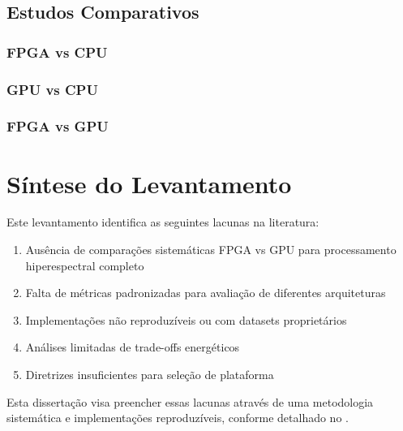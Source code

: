 \subsection{Estudos Comparativos}
\subsubsection{FPGA vs CPU}

\subsubsection{GPU vs CPU}

\subsubsection{FPGA vs GPU}

\section{Síntese do Levantamento}\label{sec:sintese}

Este levantamento identifica as seguintes lacunas na literatura:
\begin{enumerate}
    \item Ausência de comparações sistemáticas FPGA vs GPU para processamento hiperespectral completo
    \item Falta de métricas padronizadas para avaliação de diferentes arquiteturas
    \item Implementações não reproduzíveis ou com datasets proprietários
    \item Análises limitadas de trade-offs energéticos
    \item Diretrizes insuficientes para seleção de plataforma
\end{enumerate}

Esta dissertação visa preencher essas lacunas através de uma metodologia sistemática e implementações reproduzíveis, conforme detalhado no .

